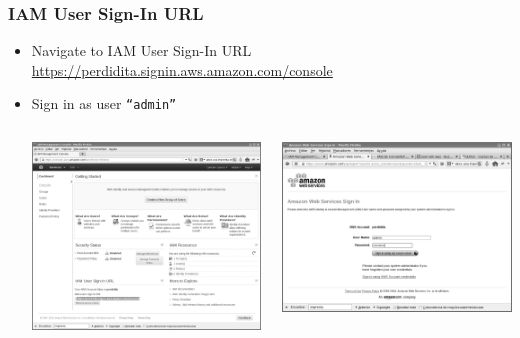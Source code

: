 \documentclass{beamer}
\begin{document}
\begin{frame}[fragile]
\frametitle{IAM User Sign-In URL}
\begin{itemize}
\item Navigate to IAM User Sign-In URL  \url{https://perdidita.signin.aws.amazon.com/console}
\item Sign in as user \texttt{``admin''}
\begin{columns}
\begin{center}
\includegraphics[scale=0.10]{siginurl.eps}
\end{center}
\begin{center}
\includegraphics[scale=0.10]{siginurl1.eps}
\end{center}
\end{columns}
\end{itemize}
\end{frame}
\end{document}
